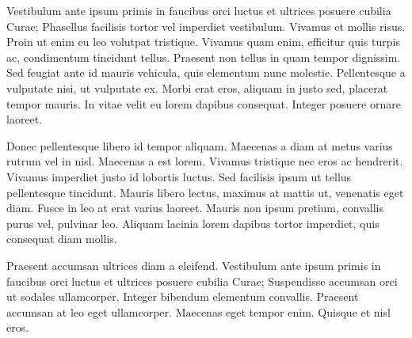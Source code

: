 \documentclass{article}%
\begin{document}
%

Vestibulum ante ipsum primis in faucibus orci luctus et ultrices posuere
cubilia Curae; Phasellus facilisis tortor vel imperdiet vestibulum. Vivamus et
mollis risus. Proin ut enim eu leo volutpat tristique. Vivamus quam enim,
efficitur quis turpis ac, condimentum tincidunt tellus. Praesent non tellus in
quam tempor dignissim. Sed feugiat ante id mauris vehicula, quis elementum nunc
molestie. Pellentesque a vulputate nisi, ut vulputate ex. Morbi erat eros,
aliquam in justo sed, placerat tempor mauris. In vitae velit eu lorem dapibus
consequat. Integer posuere ornare laoreet.

Donec pellentesque libero id tempor aliquam. Maecenas a diam at metus varius
rutrum vel in nisl. Maecenas a est lorem. Vivamus tristique nec eros ac
hendrerit. Vivamus imperdiet justo id lobortis luctus. Sed facilisis ipsum ut
tellus pellentesque tincidunt. Mauris libero lectus, maximus at mattis ut,
venenatis eget diam. Fusce in leo at erat varius laoreet. Mauris non ipsum
pretium, convallis purus vel, pulvinar leo. Aliquam lacinia lorem dapibus
tortor imperdiet, quis consequat diam mollis.

Praesent accumsan ultrices diam a eleifend. Vestibulum ante ipsum primis in
faucibus orci luctus et ultrices posuere cubilia Curae; Suspendisse accumsan
orci ut sodales ullamcorper. Integer bibendum elementum convallis. Praesent
accumsan at leo eget ullamcorper. Maecenas eget tempor enim. Quisque et nisl
eros.
%
\normalsize%
\end{document}
